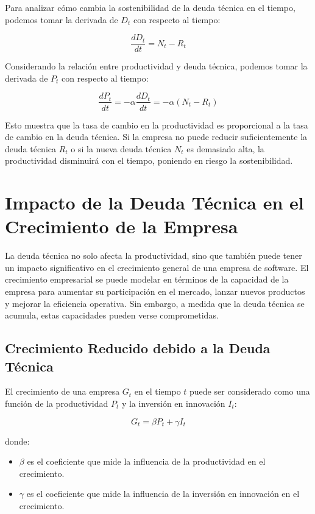 \documentclass[12pt]{article}
\begin{document}
Para analizar cómo cambia la sostenibilidad de la deuda técnica en el tiempo, podemos tomar la derivada de \(D_t\) con respecto al tiempo:

\[
\frac{dD_t}{dt} = N_t - R_t
\]

Considerando la relación entre productividad y deuda técnica, podemos tomar la derivada de \(P_t\) con respecto al tiempo:

\[
\frac{dP_t}{dt} = -\alpha \frac{dD_t}{dt} = -\alpha (N_t - R_t)
\]

Esto muestra que la tasa de cambio en la productividad es proporcional a la tasa de cambio en la deuda técnica. Si la empresa no puede reducir suficientemente la deuda técnica \(R_t\) o si la nueva deuda técnica \(N_t\) es demasiado alta, la productividad disminuirá con el tiempo, poniendo en riesgo la sostenibilidad.


\section{Impacto de la Deuda Técnica en el Crecimiento de la Empresa}

La deuda técnica no solo afecta la productividad, sino que también puede tener un impacto significativo en el crecimiento general de una empresa de software. El crecimiento empresarial se puede modelar en términos de la capacidad de la empresa para aumentar su participación en el mercado, lanzar nuevos productos y mejorar la eficiencia operativa. Sin embargo, a medida que la deuda técnica se acumula, estas capacidades pueden verse comprometidas.

\subsection{Crecimiento Reducido debido a la Deuda Técnica}

El crecimiento de una empresa \(G_t\) en el tiempo \(t\) puede ser considerado como una función de la productividad \(P_t\) y la inversión en innovación \(I_t\):

\[
G_t = \beta P_t + \gamma I_t
\]

donde:
\begin{itemize}
    \item \( \beta \) es el coeficiente que mide la influencia de la productividad en el crecimiento.
    \item \( \gamma \) es el coeficiente que mide la influencia de la inversión en innovación en el crecimiento.
\end{itemize}
\end{document}
